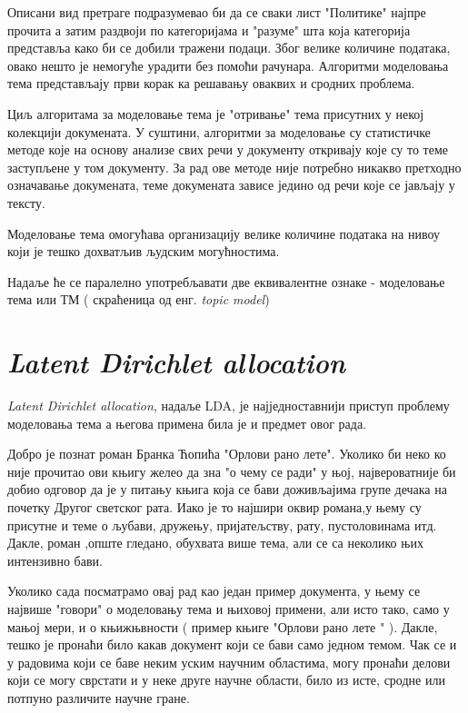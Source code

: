 Описани вид претраге подразумевао би да се сваки лист "Политике" најпре прочита а затим  раздвоји по категоријама и "разуме" шта која категорија представља  како би се добили тражени подаци. Због велике количине података, овако нешто је немогуће урадити без помоћи рачунара. Алгоритми моделовања тема представљају први корак ка решавању оваквих и сродних проблема.

Циљ алгоритама за моделовање тема је "отривање" тема присутних у некој колекцији докумената. У суштини, алгоритми за моделовање су статистичке методе које на основу анализе свих речи у документу откривају које су то теме заступљене у том документу. За рад ове методе није потребно никакво претходно означавање докумената, теме докумената зависе једино од речи које се јављају у тексту. 

Моделовање тема омогућава организацију велике количине података на нивоу који је тешко дохватљив људским могућностима.

Надаље ће се паралелно употребљавати две еквивалентне ознаке - моделовање тема или ТМ ( скраћеница од енг. \textit{topic model})

\section{\textit{Latent Dirichlet allocation}}
 
\textit{Latent Dirichlet allocation}, надаље LDA, је најједноставнији приступ проблему моделовања тема \cite{blei1} а његова  примена била је и предмет овог рада.

Добро је познат роман Бранка Ћопића "Орлови рано лете". Уколико би неко ко није прочитао ови књигу желео да зна "о чему се ради" у њој, највероватније би добио одговор да је у питању књига која се бави доживљајима групе дечака на почетку Другог светског рата. Иако је то најшири оквир романа,у њему су присутне и теме о  љубави, дружењу, пријатељству, рату, пустоловинама итд.
Дакле, роман ,опште гледано, обухвата више тема, али се са неколико њих интензивно бави.

Уколико сада посматрамо овај рад као један пример документа, у њему се највише "говори" о моделовању тема и њиховој примени, али исто тако, само у мањој мери, и о  књижњвности ( пример књиге "Орлови рано лете " ).
Дакле, тешко је пронаћи било какав документ који се бави само једном темом. Чак се и у радовима који се баве неким уским научним областима, могу пронаћи делови који се могу сврстати и у неке друге научне области, било из исте, сродне или потпуно различите научне гране.

